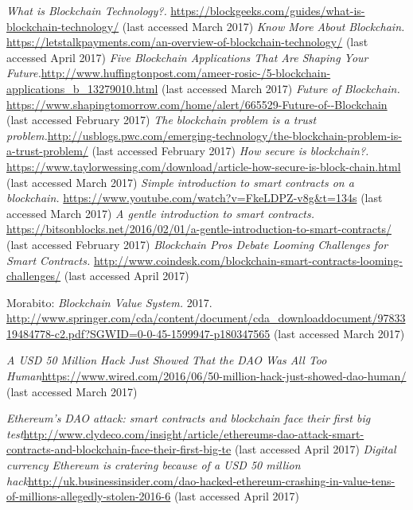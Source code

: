 \begin{thebibliography}{99}
\emph{What is Blockchain Technology?.} \url{https://blockgeeks.com/guides/what-is-blockchain-technology/} (last accessed March 2017)
\emph{Know More About Blockchain.} \url{https://letstalkpayments.com/an-overview-of-blockchain-technology/} (last accessed April 2017)
\emph{Five Blockchain Applications That Are Shaping Your Future.}\url{http://www.huffingtonpost.com/ameer-rosic-/5-blockchain-applications_b_13279010.html} (last accessed March 2017)
\emph{Future of Blockchain.} \url{https://www.shapingtomorrow.com/home/alert/665529-Future-of--Blockchain} (last accessed February 2017)
\emph{The blockchain problem is a trust problem.}\url{http://usblogs.pwc.com/emerging-technology/the-blockchain-problem-is-a-trust-problem/} (last accessed February 2017)
\emph{How secure is blockchain?.} \url{https://www.taylorwessing.com/download/article-how-secure-is-block-chain.html} (last accessed March 2017)
\emph{Simple introduction to smart contracts on a blockchain.} \url{https://www.youtube.com/watch?v=FkeLDPZ-v8g&t=134s} (last accessed March 2017)
\emph{A gentle introduction to smart contracts.} \url{https://bitsonblocks.net/2016/02/01/a-gentle-introduction-to-smart-contracts/} (last accessed February 2017)
\emph{Blockchain Pros Debate Looming Challenges for Smart Contracts.} \url{http://www.coindesk.com/blockchain-smart-contracts-looming-challenges/} (last accessed April 2017)



Morabito: \emph{Blockchain Value System.} 2017. \url{http://www.springer.com/cda/content/document/cda_downloaddocument/9783319484778-c2.pdf?SGWID=0-0-45-1599947-p180347565} (last accessed March 2017)



\emph{A USD 50 Million Hack Just Showed That the DAO Was All Too Human}\url{https://www.wired.com/2016/06/50-million-hack-just-showed-dao-human/} (last accessed March 2017)

\emph{Ethereum's DAO attack: smart contracts and blockchain face their first big test}\url{http://www.clydeco.com/insight/article/ethereums-dao-attack-smart-contracts-and-blockchain-face-their-first-big-te} (last accessed April 2017)
\emph{Digital currency Ethereum is cratering because of a USD 50 million hack}\url{http://uk.businessinsider.com/dao-hacked-ethereum-crashing-in-value-tens-of-millions-allegedly-stolen-2016-6} (last accessed April 2017)



\end{thebibliography}
